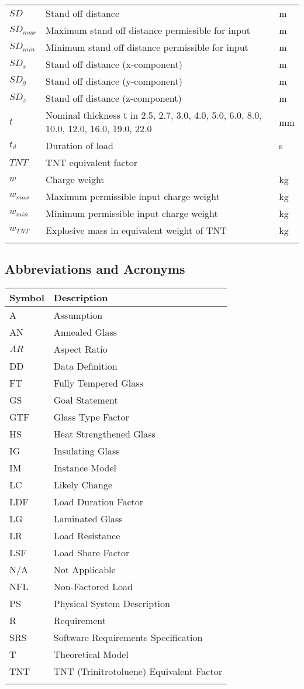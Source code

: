 \documentclass[12pt]{article}
\begin{document}
\begin{longtable*}{l l l}
\\
$SD$ & Stand off distance & m
\\
$SD_{max}$ & Maximum stand off distance permissible for input & m
\\
$SD_{min}$ & Minimum stand off distance permissible for input & m
\\
$SD_{x}$ & Stand off distance (x-component) & m
\\
$SD_{y}$ & Stand off distance (y-component) & m
\\
$SD_{z}$ & Stand off distance (z-component) & m
\\
$t$ & Nominal thickness t in {2.5, 2.7, 3.0, 4.0, 5.0, 6.0, 8.0, 10.0, 12.0, 16.0, 19.0, 22.0} & mm
\\
$t_{d}$ & Duration of load & s
\\
$TNT$ & TNT equivalent factor & 
\\
$w$ & Charge weight & kg
\\
$w_{max}$ & Maximum permissible input charge weight & kg
\\
$w_{min}$ & Minimum permissible input charge weight & kg
\\
$w_{TNT}$ & Explosive mass in equivalent weight of TNT & kg
\\
\bottomrule
\label{Table:TablofSymb}
\end{longtable*}
\subsection{Abbreviations and Acronyms}
\label{Sec:AbbrandAcro}
\begin{longtable*}{l l}
\toprule
Symbol & Description
\\
\midrule
A & Assumption
\\
AN & Annealed Glass
\\
$AR$ & Aspect Ratio
\\
DD & Data Definition
\\
FT & Fully Tempered Glass
\\
GS & Goal Statement
\\
GTF & Glass Type Factor
\\
HS & Heat Strengthened Glass
\\
IG & Insulating Glass
\\
IM & Instance Model
\\
LC & Likely Change
\\
LDF & Load Duration Factor
\\
LG & Laminated Glass
\\
LR & Load Resistance
\\
LSF & Load Share Factor
\\
N/A & Not Applicable
\\
NFL & Non-Factored Load
\\
PS & Physical System Description
\\
R & Requirement
\\
SRS & Software Requirements Specification
\\
T & Theoretical Model
\\
TNT & TNT (Trinitrotoluene) Equivalent Factor
\\
\bottomrule
\label{Table:AbbrandAcro}
\end{longtable*}
\end{document}
